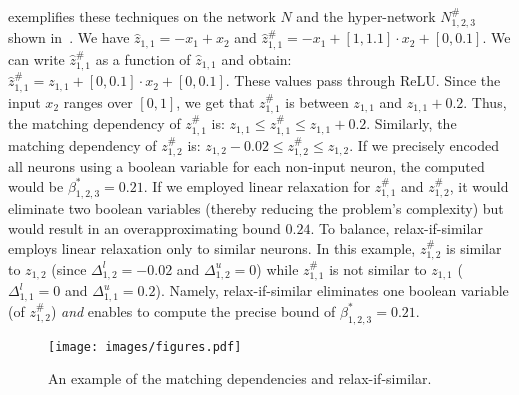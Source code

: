  exemplifies these techniques on the network $N$ and the hyper-network $N^\#_{1,2,3}$ shown in~. 
We have $\hat{z}_{1,1} = -x_1 + x_2$ and $\hat{z}^\#_{1,1} = -x_1 + [1,1.1]\cdot x_2+[0,0.1]$. We can write  $\hat{z}^\#_{1,1}$ as a function of $\hat{z}_{1,1}$ and obtain: $ \hat{z}^\#_{1,1} = z_{1,1} + [0,0.1]\cdot x_2+[0,0.1]$. 
These values pass through ReLU. Since the input $x_2$ ranges over $[0,1]$, we get that $ z^\#_{1,1}$ is between $z_{1,1}$ and ${z}_{1,1}+0.2$.
Thus, the matching dependency of $z^\#_{1,1}$ is:
$ z_{1,1} \leq z^\#_{1,1} \leq z_{1,1} + 0.2$. 
Similarly, the matching dependency of $z^\#_{1,2}$ is: $ z_{1,2} - 0.02 \leq z^\#_{1,2} \leq z_{1,2} $. 
If we precisely encoded all neurons using a boolean variable for each non-input neuron, the computed \propa would be $\beta^*_{1,2,3}=0.21$. 
If we employed linear relaxation for $z^\#_{1,1}$ and $z^\#_{1,2}$, it would eliminate two boolean variables (thereby reducing the problem's complexity) but would result in an overapproximating bound $0.24$.
To balance, relax-if-similar employs linear relaxation only to similar neurons.
In this example, $z^\#_{1,2}$ is similar to $z_{1,2}$ (since $\Delta_{1,2}^l=-0.02$ and $\Delta_{1,2}^u=0$) while $z^\#_{1,1}$ is not similar to $z_{1,1}$  ($\Delta_{1,1}^l=0$ and $\Delta_{1,1}^u=0.2$). Namely, relax-if-similar eliminates one boolean variable (of $z^\#_{1,2}$) \emph{and} enables to compute the precise bound of $\beta^*_{1,2,3}=0.21$. 












\begin{figure}[t]
    \centering
  \texttt{[image: images/figures.pdf]}
    \caption{An example of the matching dependencies and relax-if-similar.}
    \label{fig::closness_mutual_encoding}
\end{figure}

